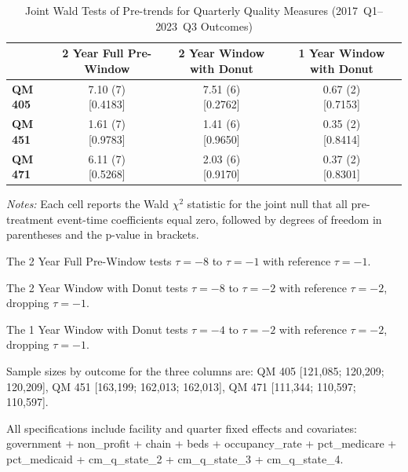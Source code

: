 \documentclass[11pt]{article}
\begin{document}
\begingroup
\begin{table}[!ht]
\centering
\begin{threeparttable}
\caption{Joint Wald Tests of Pre-trends for Quarterly Quality Measures (2017~Q1--2023~Q3 Outcomes)}
\label{tab:q_pretrend_wald_2017_2023q3}
\small
\setlength{\tabcolsep}{8pt}

\begin{tabular}{@{}lccc@{}}
\toprule
& \textbf{2 Year Full Pre-Window} & \textbf{2 Year Window with Donut} & \textbf{1 Year Window with Donut} \\
\midrule
\textbf{QM 405} & \makecell[c]{7.10 (7) \\ {[0.4183]}} & \makecell[c]{7.51 (6) \\ {[0.2762]}} & \makecell[c]{0.67 (2) \\ {[0.7153]}} \\
\textbf{QM 451} & \makecell[c]{1.61 (7) \\ {[0.9783]}} & \makecell[c]{1.41 (6) \\ {[0.9650]}} & \makecell[c]{0.35 (2) \\ {[0.8414]}} \\
\textbf{QM 471} & \makecell[c]{6.11 (7) \\ {[0.5268]}} & \makecell[c]{2.03 (6) \\ {[0.9170]}} & \makecell[c]{0.37 (2) \\ {[0.8301]}} \\
\bottomrule
\end{tabular}

\begin{tablenotes}[flushleft]
\footnotesize
\item \textit{Notes:} Each cell reports the Wald $\chi^2$ statistic for the joint null that all pre-treatment event-time coefficients equal zero, followed by degrees of freedom in parentheses and the p-value in brackets.
\item The 2 Year Full Pre-Window tests $\tau=-8$ to $\tau=-1$ with reference $\tau=-1$.
\item The 2 Year Window with Donut tests $\tau=-8$ to $\tau=-2$ with reference $\tau=-2$, dropping $\tau=-1$.
\item The 1 Year Window with Donut tests $\tau=-4$ to $\tau=-2$ with reference $\tau=-2$, dropping $\tau=-1$.
\item Sample sizes by outcome for the three columns are:
QM 405 [121,085; 120,209; 120,209],
QM 451 [163,199; 162,013; 162,013],
QM 471 [111,344; 110,597; 110,597].
\item All specifications include facility and quarter fixed effects and covariates: government + non\_profit + chain + beds + occupancy\_rate + pct\_medicare + pct\_medicaid + cm\_q\_state\_2 + cm\_q\_state\_3 + cm\_q\_state\_4.
\end{tablenotes}
\end{threeparttable}
\end{table}
\endgroup
\end{document}
